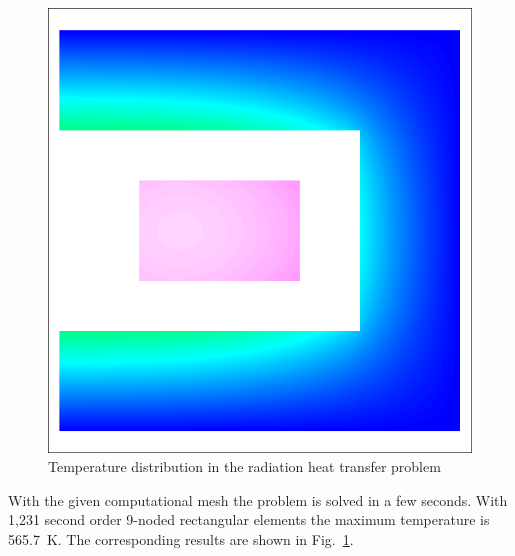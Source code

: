 \begin{figure}
\begin{center}
  \includegraphics[height=0.6\textwidth]{radiation}
\end{center}
\caption{Temperature distribution in the radiation heat transfer
problem}
\label{fig:temp_rad1}
\end{figure}
 
With the given computational mesh the problem is solved in 
a few seconds. With 1,231 second order 9-noded
rectangular elements the maximum temperature is 565.7~K.
The corresponding results are shown
in Fig.~\ref{fig:temp_rad1}.

\hfill
